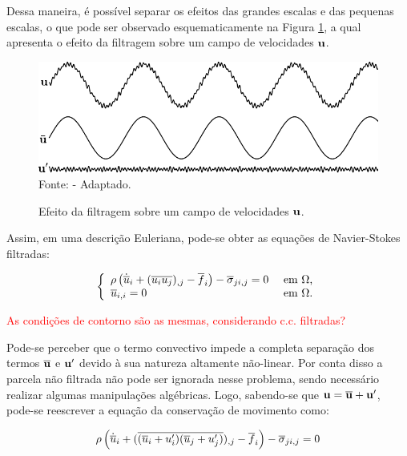 \documentclass[_ArquivoPrincipal.tex]{subfiles}
\begin{document}
Dessa maneira, é possível separar os efeitos das grandes escalas e das pequenas escalas, o que pode ser observado esquematicamente na Figura \ref{fig:EfeitoFiltragem}, a qual apresenta o efeito da filtragem sobre um campo de velocidades $\mathbf{u}$.

\begin{figure}[h]
    \centering
    \caption{Efeito da filtragem sobre um campo de velocidades $\mathbf{u}$.}
    \includegraphics[width=.75\linewidth]{Figuras/efeito_filtragem.pdf}
    \\Fonte:  - Adaptado.
    \label{fig:EfeitoFiltragem}
\end{figure}

Assim, em uma descrição Euleriana, pode-se obter as equações de Navier-Stokes filtradas:

\begin{equation}
    \left\{
    \begin{array}{ll}
        \rho\left({\dot{\overline{u}}_i+(\overline{u_iu_j})_{,j}-\overline{f}_i}\right)-\overline{\sigma}_{ji,j}=0 & \text{ em }\Omega\text{,} \\
        \overline{u}_{i,i}=0                                                                       & \text{ em }\Omega\text{.}
    \end{array}
    \right.
\end{equation}

\textcolor{red}{As condições de contorno são as mesmas, considerando c.c. filtradas?}

Pode-se perceber que o termo convectivo impede a completa separação dos termos $\overline{\mathbf{u}}$ e $\mathbf{u}'$ devido à sua natureza altamente não-linear. Por conta disso a parcela não filtrada não pode ser ignorada nesse problema, sendo necessário realizar algumas manipulações algébricas. Logo, sabendo-se que $\mathbf{u}=\overline{\mathbf{u}}+\mathbf{u}'$, pode-se reescrever a equação da conservação de movimento como:

\begin{equation}
    \rho\left({\dot{\overline{u}}_i+(\overline{(\overline{u}_i+u'_i)(\overline{u}_j+u'_j)})_{,j}-\overline{f}_i}\right)-\overline{\sigma}_{ji,j}=0
\end{equation}
\end{document}
